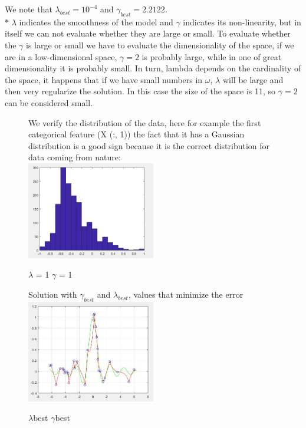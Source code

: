 We note that $\lambda_{best} = 10^{-4}$ and $\gamma_{best} = 2.2122$.\\* $\lambda$ indicates the smoothness of the model and $\gamma$ indicates its non-linearity, but in itself we can not evaluate whether they are large or small.
To evaluate whether the $\gamma$ is large or small we have to evaluate the dimensionality of the space, if we are in a low-dimensional space, $\gamma = 2$ is probably large, while in one of great dimensionality it is probably small. In turn, lambda depends on the cardinality of the space, it happens that if we have small numbers in $\omega$, $\lambda$ will be large and then very regularize the solution.
In this case the size of the space is 11, so $\gamma = 2$ can be considered small.\\
\begin{figure}
We verify the distribution of the data, here for example the first categorical feature (X (:, 1)) the fact that it has a Gaussian distribution is a good sign because it is the correct distribution for data coming from nature:\\
	
	\includegraphics[width=0.5\textwidth]{hist1.png}
	\centering
	\caption{$\lambda$ = 1 $\gamma$ = 1}
	\label{fig:\lambda = 1 \gamma = 1}

	
\end{figure}

\begin{figure}

Solution with $\gamma_{best}$ and $\lambda_{best}$, values that minimize the error\\

	\includegraphics[width=0.5\textwidth]{kmlbgb.png}
	\centering
	\caption{$\lambda$best $\gamma$best}
	
	
\end{figure}


